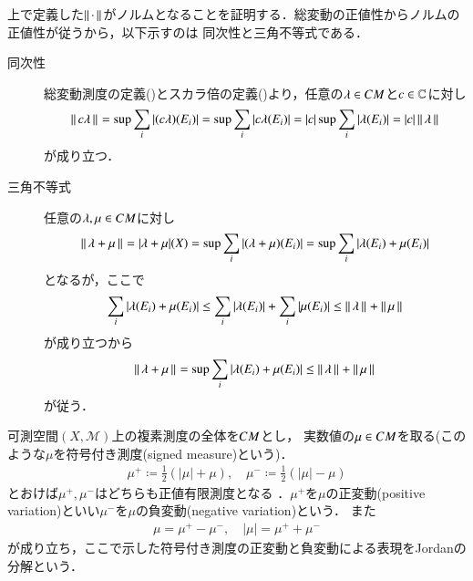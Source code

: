 	上で定義した$\left\|\, \cdot\, \right\|_{}$がノルムとなることを証明する．総変動の正値性からノルムの正値性が従うから，以下示すのは
	同次性と三角不等式である．
	\begin{description}
		\item[同次性]
			総変動測度の定義()とスカラ倍の定義()より，任意の$\lambda \in CM$と$c \in \mathbb{C}$に対し
			\begin{align}
				\left\|\, c\lambda\, \right\|_{} = \operatorname*{sup}_{} \sum_{i}|(c\lambda)(E_i)| = \operatorname*{sup}_{} \sum_{i}|c\lambda(E_i)| = |c|\operatorname*{sup}_{} \sum_{i}|\lambda(E_i)| = |c|\left\|\, \lambda\, \right\|_{}
			\end{align}
			が成り立つ．
			
		\item[三角不等式]
			任意の$\lambda,\mu \in CM$に対し
			\begin{align}
				\left\|\, \lambda + \mu\, \right\|_{} = |\lambda + \mu|(X) = \operatorname*{sup}_{} \sum_{i} |(\lambda + \mu)(E_i)| = \operatorname*{sup}_{} \sum_{i} |\lambda(E_i) + \mu(E_i)|
			\end{align}
			となるが，ここで
			\begin{align}
				\sum_{i} |\lambda(E_i) + \mu(E_i)| \leq \sum_{i} |\lambda(E_i)| + \sum_{i} |\mu(E_i)| \leq \left\|\, \lambda\, \right\|_{} + \left\|\, \mu\, \right\|_{}
			\end{align}
			が成り立つから
			\begin{align}
				\left\|\, \lambda + \mu\, \right\|_{} = \operatorname*{sup}_{} \sum_{i} |\lambda(E_i) + \mu(E_i)| \leq \left\|\, \lambda\, \right\|_{} + \left\|\, \mu\, \right\|_{}
			\end{align}
			が従う．
	\end{description}
	
	\begin{itembox}[l]{}
		\begin{dfn}
			可測空間$(X,\mathcal{M})$上の複素測度の全体を$CM$とし，
			実数値の$\mu \in CM$を取る({\scriptsize このような$\mu$を符号付き測度(signed measure)という})．
			\begin{align}
				\mu^+ \coloneqq \frac{1}{2}(|\mu| + \mu) , \quad \mu^- \coloneqq \frac{1}{2}(|\mu| - \mu)
			\end{align}
			とおけば$\mu^+,\mu^-$はどちらも正値有限測度となる\footnotemark
			．$\mu^+$を$\mu$の正変動(positive variation)といい$\mu^-$を$\mu$の負変動(negative variation)という．
			また
			\begin{align}
				\mu = \mu^+ - \mu^-, \quad |\mu| = \mu^+ + \mu^-
			\end{align}
			が成り立ち，ここで示した符号付き測度の正変動と負変動による表現をJordanの分解という．
		\end{dfn}
	\end{itembox}
	
